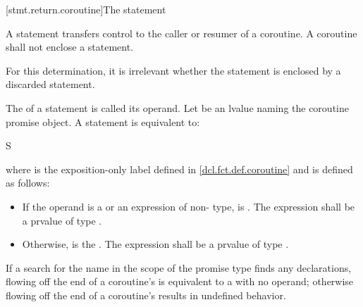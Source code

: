 [stmt.return.coroutine]{The  statement}%
%
%

\begin{bnf}
\br
      \terminal{;}
\end{bnf}

\pnum
A  statement transfers control to
the caller or resumer of a coroutine.
A coroutine shall not enclose
a  statement.
\begin{note}
For this determination, it is irrelevant whether the  statement
is enclosed by a discarded statement.
\end{note}

\pnum
The  of a  statement is
called its operand.
Let  be an lvalue naming the coroutine
promise object.
A  statement is equivalent to:
\begin{ncsimplebnf}
\terminal{\{} S\terminal{;}  \terminal{;} \terminal{\}}
\end{ncsimplebnf}
where  is the exposition-only label
defined in \ref{dcl.fct.def.coroutine}
and  is defined as follows:
\begin{itemize}
\item
If the operand is a  or an expression of non- type,
 is \tcode{)}.
The expression  shall be a prvalue of type .

\item
Otherwise,
 is the  \tcode{\{}{ } \tcode{;} \tcode{;{ }\}}.
The expression 
shall be a prvalue of type .
\end{itemize}

\pnum
If a search for the name  in the scope of the promise type
finds any declarations,
flowing off the end of a coroutine's 
is equivalent to a  with no operand;
otherwise flowing off the end of a coroutine's 
results in undefined behavior.

